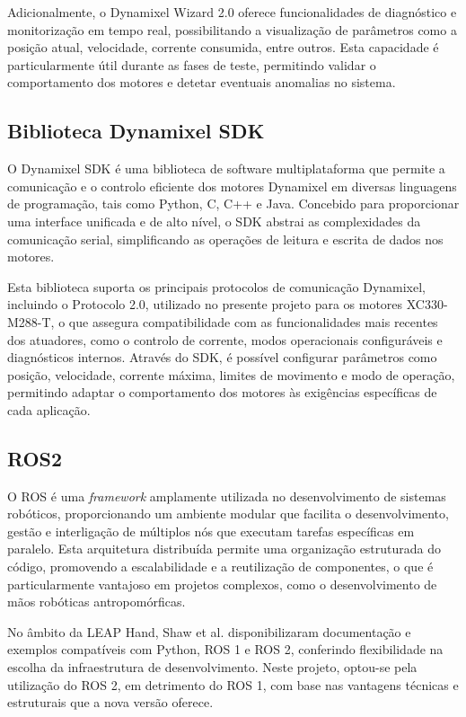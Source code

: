 Adicionalmente, o Dynamixel Wizard 2.0 oferece funcionalidades de diagnóstico e monitorização em tempo real, possibilitando a visualização de parâmetros como a posição atual, velocidade, corrente consumida, entre outros. Esta capacidade é particularmente útil durante as fases de teste, permitindo validar o comportamento dos motores e detetar eventuais anomalias no sistema.

\subsection{Biblioteca Dynamixel SDK}

O Dynamixel SDK é uma biblioteca de software multiplataforma que permite a comunicação e o controlo eficiente dos motores Dynamixel em diversas linguagens de programação, tais como Python, C, C++ e Java. Concebido para proporcionar uma interface unificada e de alto nível, o SDK abstrai as complexidades da comunicação serial, simplificando as operações de leitura e escrita de dados nos motores.

Esta biblioteca suporta os principais protocolos de comunicação Dynamixel, incluindo o Protocolo 2.0, utilizado no presente projeto para os motores XC330-M288-T, o que assegura compatibilidade com as funcionalidades mais recentes dos atuadores, como o controlo de corrente, modos operacionais configuráveis e diagnósticos internos. Através do SDK, é possível configurar parâmetros como posição, velocidade, corrente máxima, limites de movimento e modo de operação, permitindo adaptar o comportamento dos motores às exigências específicas de cada aplicação.

\subsection{ROS2}

O \ac{ROS} é uma \textit{framework} amplamente utilizada no desenvolvimento de sistemas robóticos, proporcionando um ambiente modular que facilita o desenvolvimento, gestão e interligação de múltiplos nós que executam tarefas específicas em paralelo. Esta arquitetura distribuída permite uma organização estruturada do código, promovendo a escalabilidade e a reutilização de componentes, o que é particularmente vantajoso em projetos complexos, como o desenvolvimento de mãos robóticas antropomórficas.

No âmbito da LEAP Hand, Shaw et al. \cite{shaw2023leaphand} disponibilizaram documentação e exemplos compatíveis com Python, ROS 1 e ROS 2, conferindo flexibilidade na escolha da infraestrutura de desenvolvimento. Neste projeto, optou-se pela utilização do ROS 2, em detrimento do ROS 1, com base nas vantagens técnicas e estruturais que a nova versão oferece.

